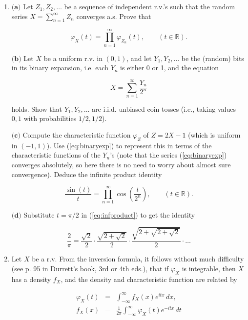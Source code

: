 \documentclass[11pt]{report}
\newcommand{\R}{\mathbb{R}}
\theoremstyle{plain}
\theoremstyle{definition}
\begin{document}
\begin{enumerate}[label=\arabic*.]
$\textbf{(b)}$ Show that $X$ is equal in distribution to $-X$ if and only if $\varphi_X$ is a real-valued function.
\item $\textbf{(a)}$ Let $Z_1,Z_2,\ldots$ be a sequence of independent r.v.'s such that the random series
$X = \sum_{n=1}^\infty Z_n$
converges a.s. Prove that

\[
\varphi_X(t) = \prod_{n=1}^\infty \varphi_{Z_n}(t), \qquad (t\in \R).
\]

$\textbf{(b)}$ Let $X$ be a uniform r.v. in $(0,1)$, and let $Y_1, Y_2, \ldots$ be the (random) bits in its binary expansion, i.e. each $Y_n$ is either 0 or 1, and the equation

\begin{equation*}
\tag{39}\label{eq:binaryexp}
X = \sum_{n=1}^\infty \frac{Y_n}{2^n}
\end{equation*}

holds. Show that $Y_1, Y_2, \ldots$ are i.i.d. unbiased coin tosses (i.e., taking values $0,1$ with probabilities $1/2,1/2$).

$\textbf{(c)}$ Compute the characteristic function $\varphi_Z$ of $Z=2X-1$ (which is uniform in $(-1,1)$). Use (\ref{eq:binaryexp}) to represent this in terms of the characteristic functions of the $Y_n$'s
(note that the series (\ref{eq:binaryexp}) converges absolutely, so here there is no need to worry about almost sure convergence). Deduce the infinite product identity

\begin{equation*}
\tag{40}\label{eq:infproduct}
\frac{\sin(t)}{t} = \prod_{n=1}^\infty \cos\left(\frac{t}{2^n} \right), \qquad (t\in \R).
\end{equation*}

$\textbf{(d)}$ Substitute $t=\pi/2$ in (\ref{eq:infproduct}) to get the identity

\[
\frac{2}{\pi} = \frac{\sqrt{2}}{2}\cdot \frac{\sqrt{2+\sqrt{2}}}{2} \cdot \frac{\sqrt{2+\sqrt{2+\sqrt{2}}}}{2} \cdot \ldots
\]
\item Let $X$ be a r.v. From the inversion formula, it follows without much difficulty (see p. 95 in Durrett's book, 3rd or 4th eds.), that if $\varphi_X$ is integrable, then $X$ has a density $f_X$, and the density and characteristic function are related by

\begin{eqnarray*} \varphi_X(t) &=& \int_{-\infty}^\infty f_X(x) e^{itx}\,dx,  \\
f_X(x) &=& \frac{1}{2\pi} \int_{-\infty}^\infty \varphi_X(t) e^{-itx}\,dt
\end{eqnarray*}


\end{enumerate}
\end{document}
